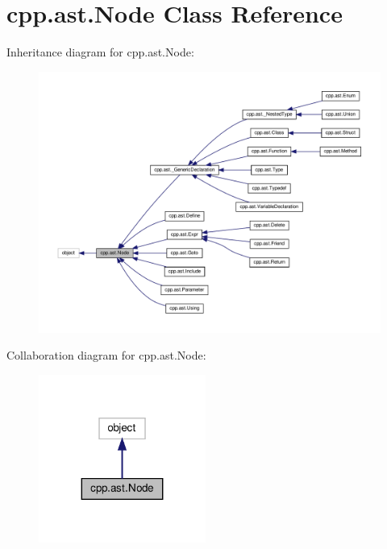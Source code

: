 \hypertarget{classcpp_1_1ast_1_1_node}{}\section{cpp.\+ast.\+Node Class Reference}
\label{classcpp_1_1ast_1_1_node}


Inheritance diagram for cpp.\+ast.\+Node\+:
\nopagebreak
\begin{figure}[H]
\begin{center}
\leavevmode
\includegraphics[width=350pt]{classcpp_1_1ast_1_1_node__inherit__graph}
\end{center}
\end{figure}


Collaboration diagram for cpp.\+ast.\+Node\+:
\nopagebreak
\begin{figure}[H]
\begin{center}
\leavevmode
\includegraphics[width=155pt]{classcpp_1_1ast_1_1_node__coll__graph}
\end{center}
\end{figure}
